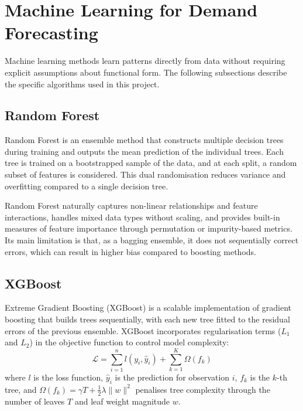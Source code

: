 \section{Machine Learning for Demand Forecasting}\label{sec:ml_forecasting}

Machine learning methods learn patterns directly from data without requiring explicit assumptions about functional form. The following subsections describe the specific algorithms used in this project.

\subsection{Random Forest}

Random Forest \parencite{breiman2001randomforest} is an ensemble method that constructs multiple decision trees during training and outputs the mean prediction of the individual trees. Each tree is trained on a bootstrapped sample of the data, and at each split, a random subset of features is considered. This dual randomisation reduces variance and overfitting compared to a single decision tree.

Random Forest naturally captures non-linear relationships and feature interactions, handles mixed data types without scaling, and provides built-in measures of feature importance through permutation or impurity-based metrics. Its main limitation is that, as a bagging ensemble, it does not sequentially correct errors, which can result in higher bias compared to boosting methods.

\subsection{XGBoost}

Extreme Gradient Boosting (XGBoost) \parencite{chen2016xgboost} is a scalable implementation of gradient boosting that builds trees sequentially, with each new tree fitted to the residual errors of the previous ensemble. XGBoost incorporates regularisation terms ($L_1$ and $L_2$) in the objective function to control model complexity:
\begin{equation}\label{eq:xgboost_obj}
    \mathcal{L} = \sum_{i=1}^{n} l(y_i, \hat{y}_i) + \sum_{k=1}^{K} \Omega(f_k)
\end{equation}
where $l$ is the loss function, $\hat{y}_i$ is the prediction for observation $i$, $f_k$ is the $k$-th tree, and $\Omega(f_k) = \gamma T + \frac{1}{2}\lambda \|w\|^2$ penalises tree complexity through the number of leaves $T$ and leaf weight magnitude $w$.

